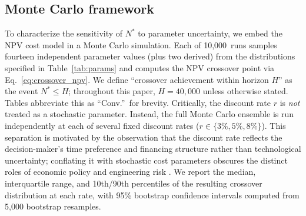 \documentclass[preprint,12pt]{elsarticle}
\begin{document}
\subsection{Monte Carlo framework}

To characterize the sensitivity of $N^*$ to parameter uncertainty, we embed the NPV cost model in a Monte Carlo simulation. Each of 10{,}000~runs samples fourteen independent parameter values (plus two derived) from the distributions specified in Table~\ref{tab:params} and computes the NPV crossover point via Eq.~\ref{eq:crossover_npv}. We define ``crossover achievement within horizon $H$'' as the event $N^* \leq H$; throughout this paper, $H = 40{,}000$ unless otherwise stated. Tables abbreviate this as ``Conv.''\ for brevity. Critically, the discount rate $r$ is \emph{not} treated as a stochastic parameter. Instead, the full Monte Carlo ensemble is run independently at each of several fixed discount rates ($r \in \{3\%, 5\%, 8\%\}$). This separation is motivated by the observation that the discount rate reflects the decision-maker's time preference and financing structure rather than technological uncertainty; conflating it with stochastic cost parameters obscures the distinct roles of economic policy and engineering risk \cite{arrow2014}. We report the median, interquartile range, and 10th/90th percentiles of the resulting crossover distribution at each rate, with 95\% bootstrap confidence intervals computed from 5{,}000 bootstrap resamples.
\end{document}
